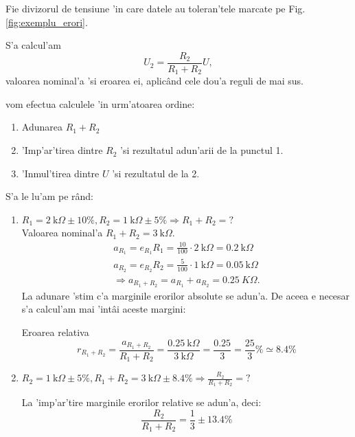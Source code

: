 \begin{example}[]
  Fie divizorul de tensiune 'in care datele au toleran'tele marcate pe Fig. \ref{fig:exemplu_erori}.

S'a calcul'am
\begin{equation} \label{eq:exemplu_erori}
U_2 = \frac{R_2}{R_1+R_2}U,
\end{equation}
valoarea nominal'a 'si eroarea ei, aplic\^and cele dou'a reguli de mai sus.

vom efectua calculele 'in urm'atoarea ordine:
\begin{enumerate}
\item Adunarea $R_1+R_2$
\item 'Imp'ar'tirea dintre $R_2$ 'si rezultatul adun'arii de la punctul 1.
\item 'Inmul'tirea dintre $U$ 'si rezultatul de la 2.
\end{enumerate}

S'a le lu'am pe r\^and:
\begin{enumerate}
\item \textcolor{Bittersweet}{$R_1 = 2~\mathrm{k}\Omega\pm10\%, R_2 = 1~\mathrm{k}\Omega\pm5\% \Longrightarrow R_1+R_2=?$}\\
Valoarea nominal'a $R_1 + R_2 = 3~\mathrm{k}\Omega$.
  \begin{align*}
    a_{R_1} = e_{R_1}R_1 = \frac{10}{100}\cdot 2~\mathrm{k}\Omega = 0.2~\mathrm{k}\Omega \\
    a_{R_2} = e_{R_2}R_2 = \frac{5}{100}\cdot 1~\mathrm{k}\Omega = 0.05~\mathrm{k}\Omega \\
    \Longrightarrow a_{R_1+R_2} = a_{R_1} + a_{R_2} = 0.25 ~K\Omega.
  \end{align*}
La adunare 'stim c'a marginile erorilor absolute se adun'a. De aceea e necesar s'a calcul'am mai 'int\^ai aceste margini:

Eroarea relativa 
\begin{equation*}
r_{R_1+R_2} = \frac{a_{R_1+R_2}}{R_1+R_2} = \frac{0.25~\mathrm{k}\Omega}{3~\mathrm{k}\Omega} = \frac{0.25}{3} = \frac{25}{3}\% \simeq 8.4\%
\end{equation*}

\item \textcolor{Bittersweet}{$R_2 = 1~\mathrm{k}\Omega\pm5\%, R_1+R_2 = 3~\mathrm{k}\Omega\pm8.4\% \Longrightarrow \frac{R_2}{R_1+R_2}=?$}

La 'imp'ar'tire marginile erorilor relative se adun'a, deci:
\begin{equation*}
\frac{R_2}{R_1+R_2} = \frac{1}{3} \pm 13.4\%
\end{equation*}



\end{enumerate}
\end{example}
